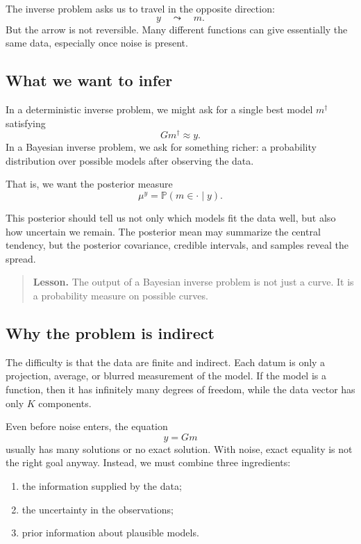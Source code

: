 \documentclass[11pt,a4paper]{book}
\newenvironment{lesson}
  {\begin{quote}\textbf{Lesson.}}
  {\end{quote}}
\newcommand{\post}{\mu^y}
\newcommand{\obs}{y}
\newcommand{\G}{G}
\begin{document}
The inverse problem asks us to travel in the opposite direction:
\[
    \obs
    \quad \leadsto \quad
    m.
\]
But the arrow is not reversible. Many different functions can give essentially
the same data, especially once noise is present.

\subsection{What we want to infer}

In a deterministic inverse problem, we might ask for a single best model
$m^\dagger$ satisfying
\[
    \G m^\dagger \approx \obs.
\]
In a Bayesian inverse problem, we ask for something richer: a probability
distribution over possible models after observing the data.

That is, we want the posterior measure
\[
    \post = \mathbb{P}(m \in \cdot \mid \obs).
\]

This posterior should tell us not only which models fit the data well, but also
how uncertain we remain. The posterior mean may summarize the central tendency,
but the posterior covariance, credible intervals, and samples reveal the spread.

\begin{lesson}
The output of a Bayesian inverse problem is not just a curve. It is a
probability measure on possible curves.
\end{lesson}

\subsection{Why the problem is indirect}

The difficulty is that the data are finite and indirect. Each datum is only a
projection, average, or blurred measurement of the model. If the model is a
function, then it has infinitely many degrees of freedom, while the data vector
has only $K$ components.

Even before noise enters, the equation
\[
    \obs = \G m
\]
usually has many solutions or no exact solution. With noise, exact equality is
not the right goal anyway. Instead, we must combine three ingredients:
\begin{enumerate}[label=\arabic*.]
    \item the information supplied by the data;
    \item the uncertainty in the observations;
    \item prior information about plausible models.
\end{enumerate}
\end{document}
